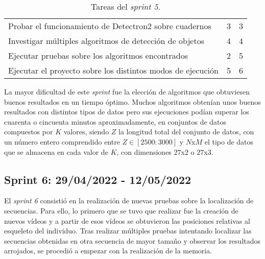\begin{table}[H]
{\begin{tabular}{p{10cm}cc}
\rowcolor[HTML]{EFEFEF} 
Probar el funcionamiento de Detectron2 sobre cuadernos                                      & 3                                                         & 3                                                          \\
\rowcolor[HTML]{ECF4FF} 
Investigar múltiples algoritmos de detección de objetos                                     & 4                                                         & 4                                                          \\
\rowcolor[HTML]{EFEFEF} 
Ejecutar pruebas sobre los algoritmos encontrados                                           & 2                                                         & 5                                                          \\
\rowcolor[HTML]{ECF4FF} 
Ejecutar el proyecto sobre los distintos modos de ejecución                                 & 5                                                         & 6                                                          \\ \hline

\end{tabular}
}
\caption{Tareas del \textit{sprint 5}.}
\label{sprint5}
\end{table}

La mayor dificultad de este \textit{sprint} fue la elección de algoritmos que obtuviesen buenos resultados en un tiempo óptimo. Muchos algoritmos obtenían unos buenos resultados con distintos tipos de datos pero sus ejecuciones podían superar los cuarenta o cincuenta minutos aproximadamente, en conjuntos de datos compuestos por $K$ valores, siendo $Z$ la longitud total del conjunto de datos, con un número entero comprendido entre $Z \in [2500:3000]$ y $N$x$M$ el tipo de datos que se almacena en cada valor de $K$, con dimensiones $27$x$2$ o $27$x$3$.

\subsection{Sprint 6: 29/04/2022 - 12/05/2022}

El \textit{sprint 6} consistió en la realización de nuevas pruebas sobre la localización de secuencias. Para ello, lo primero que se tuvo que realizar fue la creación de nuevos vídeos y a partir de esos vídeos se obtuvieron las posiciones relativas al esqueleto del individuo. Tras realizar múltiples pruebas intentando localizar las secuencias obtenidas en otra secuencia de mayor tamaño y observar los resultados arrojados, se procedió a empezar con la realización de la memoria. 


